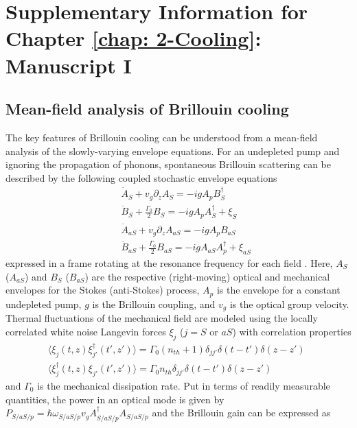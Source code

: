 \appendix
\chapter{Supplementary Information for Chapter \ref{chap: 2-Cooling}: Manuscript I}
\label{appendix: 2-Cooling}
\acresetall

\section{Mean-field analysis of Brillouin cooling}
\label{SI:meanField}
The key features of Brillouin cooling can be understood from a mean-field analysis of the slowly-varying envelope equations. For an undepleted pump and ignoring the propagation of phonons, spontaneous Brillouin scattering can be described by the following coupled stochastic envelope equations
\begin{eqnarray}
\label{SVE}
   && \dot{A}_S + v_g \partial_z A_S = -i g A_p B_S^\dag \\
   && \dot{B}_S + \frac{\Gamma_0}{2} B_S  = -i g A_p A_S^\dag + \xi_S \\
      \label{SVE-3}
   && \dot{A}_{aS} + v_g \partial_z A_{aS} = -i g A_p B_{aS} \\
   \label{SVE-4}
   && \dot{B}_{aS} + \frac{\Gamma_0}{2} B_{aS}  = -i g A_{aS} A_p^\dag + \xi_{aS}
\end{eqnarray}
expressed in a frame rotating at the resonance frequency for each field \cite{kharel2016noise}.
Here, $A_{S}$ ($A_{aS}$) and $B_{S}$ ($B_{aS}$) are the respective (right-moving) optical and mechanical envelopes for the Stokes (anti-Stokes) process, $A_p$ is the envelope for a constant undepleted pump, $g$ is the Brillouin coupling, and $v_g$ is the optical group velocity. Thermal fluctuations of the mechanical field are modeled using the locally correlated white noise Langevin forces
$\xi_{j}$ ($j=S$ or $aS$)  with correlation properties
\begin{eqnarray}
  &&  \langle \xi_j(t,z) \xi_{j'}^\dag(t',z')\rangle = \Gamma_0 (n_{th}+1) \delta_{jj'} \delta(t-t')\delta(z-z') \quad \quad \\
  \label{corr-2}
  && \langle \xi_j^\dag(t,z) \xi_{j'}(t',z')\rangle = \Gamma_0 n_{th} \delta_{jj'} \delta(t-t')\delta(z-z')
\end{eqnarray}
and $\Gamma_0$ is the mechanical dissipation rate. Put in terms of readily measurable quantities, the power in an optical mode is given by $P_{S/aS/p} = \hbar \omega_{S/aS/p} v_g A^\dag_{S/aS/p}A_{S/aS/p}$ and the Brillouin gain can be expressed as

